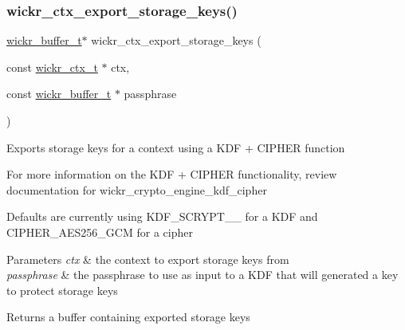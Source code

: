 \subsubsection{\texorpdfstring{wickr\+\_\+ctx\+\_\+export\+\_\+storage\+\_\+keys()}{wickr\_ctx\_export\_storage\_keys()}}
{\footnotesize\ttfamily \mbox{\hyperlink{structwickr__buffer}{wickr\+\_\+buffer\+\_\+t}}$\ast$ wickr\+\_\+ctx\+\_\+export\+\_\+storage\+\_\+keys (\begin{DoxyParamCaption}\item[{const \mbox{\hyperlink{structwickr__ctx}{wickr\+\_\+ctx\+\_\+t}} $\ast$}]{ctx,  }\item[{const \mbox{\hyperlink{structwickr__buffer}{wickr\+\_\+buffer\+\_\+t}} $\ast$}]{passphrase }\end{DoxyParamCaption})}

Exports storage keys for a context using a K\+DF + C\+I\+P\+H\+ER function

For more information on the K\+DF + C\+I\+P\+H\+ER functionality, review documentation for \textquotesingle{}wickr\+\_\+crypto\+\_\+engine\+\_\+kdf\+\_\+cipher\textquotesingle{}

Defaults are currently using K\+D\+F\+\_\+\+S\+C\+R\+Y\+P\+T\+\_\+\_ for a K\+DF and C\+I\+P\+H\+E\+R\+\_\+\+A\+E\+S256\+\_\+\+G\+CM for a cipher


\begin{DoxyParams}{Parameters}
{\em ctx} & the context to export storage keys from \\
\hline
{\em passphrase} & the passphrase to use as input to a K\+DF that will generated a key to protect storage keys \\
\hline
\end{DoxyParams}
\begin{DoxyReturn}{Returns}
a buffer containing exported storage keys 
\end{DoxyReturn}
\mbox{\label{group__wickr__ctx_ga2dadd40adc0217dd337ee6cf745cbc12}} 
